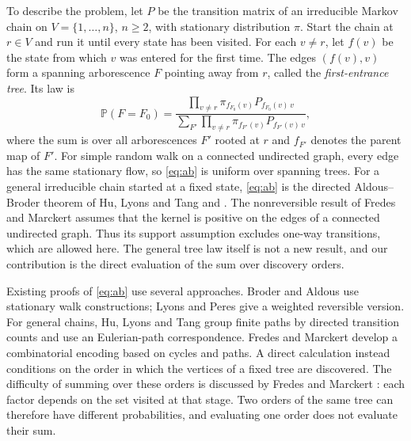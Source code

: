 \documentclass[onefignum,onetabnum,nohypdvips]{siamart250211}
\numberwithin{theorem}{section}
\numberwithin{equation}{section}
\newcommand{\pr}{\mathbb{P}}
\begin{document}
To describe the problem, let $P$ be the transition matrix of an
irreducible Markov chain on $V=\{1,\dots,n\}$, $n\ge2$, with stationary
distribution $\pi$. Start the chain at $r\in V$ and run it until every
state has been visited. For each $v\ne r$, let $f(v)$ be the state from
which $v$ was entered for the first time. The edges $(f(v),v)$ form a
spanning arborescence $F$ pointing away from $r$, called the
\emph{first-entrance tree}. Its law is
\begin{equation}\label{eq:ab}
\pr(F=F_0)=\frac{\prod_{v\ne r}\pi_{f_{F_0}(v)}P_{f_{F_0}(v)\,v}}
{\sum_{F'}\prod_{v\ne r}\pi_{f_{F'}(v)}P_{f_{F'}(v)\,v}},
\end{equation}
where the sum is over all arborescences $F'$ rooted at $r$ and
$f_{F'}$ denotes the parent map of $F'$. For simple random walk on a
connected undirected graph, every edge has the same stationary flow,
so \eqref{eq:ab} is uniform over spanning trees. For a general
irreducible chain started at a fixed state, \eqref{eq:ab} is the
directed Aldous--Broder theorem of Hu, Lyons and Tang
\cite[Thm.~3.4]{HuLyonsTang2021} and \cite[Thm.~3]{FredesMarckert2023}. The nonreversible result of Fredes and Marckert
\cite[Thm.~3]{FredesMarckert2023} assumes that the kernel is
positive on the edges of a connected undirected graph. Thus its
support assumption excludes one-way transitions, which are allowed
here. The general tree law itself is not a new result, and our contribution
is the direct evaluation of the sum over discovery orders.

Existing proofs of \eqref{eq:ab} use several approaches. Broder
\cite{Broder1989} and Aldous \cite{Aldous1990} use stationary walk
constructions; Lyons and Peres \cite[Cor.~4.9]{LyonsPeres2016} give a
weighted reversible version. For general chains, Hu, Lyons and Tang
\cite{HuLyonsTang2021} group finite paths by directed transition counts
and use an Eulerian-path correspondence. Fredes and Marckert
\cite{FredesMarckert2023} develop a combinatorial encoding based on
cycles and paths. A direct calculation instead conditions on the
order in which the vertices of a fixed tree are discovered. The
difficulty of summing over these orders is discussed by Fredes and
Marckert \cite[\S1 and Remark~19]{FredesMarckert2023}: each factor
depends on the set visited at that stage. Two orders of the same tree
can therefore have different probabilities, and evaluating one order
does not evaluate their sum.
\end{document}
